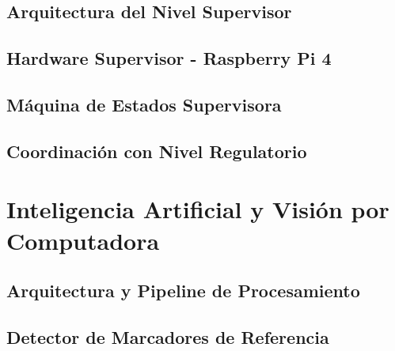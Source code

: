 \documentclass[a4paper,12pt]{report}
\begin{document}
\subsection{Arquitectura del Nivel Supervisor}


\subsection{Hardware Supervisor - Raspberry Pi 4}



\subsection{Máquina de Estados Supervisora}




\subsection{Coordinación con Nivel Regulatorio}




\section{Inteligencia Artificial y Visión por Computadora}

\subsection{Arquitectura y Pipeline de Procesamiento}



\subsection{Detector de Marcadores de Referencia}




\end{document}
